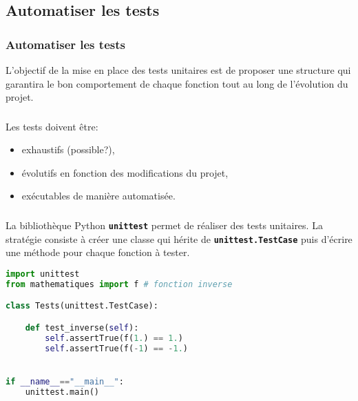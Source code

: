 \documentclass[svgnames,11pt]{beamer}
\begin{document}
\subsection{Automatiser les tests}
\begin{frame}
    \frametitle{Automatiser les tests}

    \begin{aretenir}[]
        L'objectif de la mise en place des tests unitaires est de proposer une structure qui garantira le bon comportement de chaque fonction tout au long de l'évolution du projet.
    \end{aretenir}

\end{frame}
\begin{frame}
    \frametitle{}
    Les tests doivent être:
    \begin{itemize}
        \item exhaustifs (possible?),
        \item évolutifs en fonction des modifications du projet,
        \item exécutables de manière automatisée.
    \end{itemize}
\end{frame}
\begin{frame}[fragile]
    \frametitle{}

    La bibliothèque Python \textbf{\texttt{unittest}} permet de réaliser des tests unitaires. La stratégie consiste à créer une classe qui hérite de \textbf{\texttt{unittest.TestCase}} puis d'écrire une méthode pour chaque fonction à tester.

    \begin{center}
        \begin{lstlisting}[language=Python , basicstyle=\ttfamily\small, xleftmargin=2em, xrightmargin=2em]
import unittest
from mathematiques import f # fonction inverse

class Tests(unittest.TestCase):

    def test_inverse(self):
        self.assertTrue(f(1.) == 1.)
        self.assertTrue(f(-1) == -1.)


if __name__=="__main__":
    unittest.main()
\end{lstlisting}
    \end{center}
\end{frame}
\end{document}
